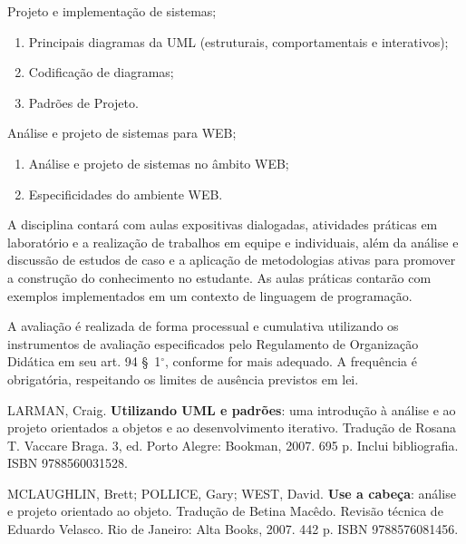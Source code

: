 \begin{pud}
\begin{description}[itemsep=0em]
		\item[UNIDADE III:] Projeto e implementação de sistemas; 
	         \begin{enumerate}[itemsep=0em, topsep=0em]
				\item Principais diagramas da UML (estruturais, comportamentais  e interativos);
				\item Codificação de diagramas;
				\item Padrões de Projeto.
            \end{enumerate}
            
        \item[UNIDADE IV:] Análise e projeto de sistemas para WEB;
	         \begin{enumerate}[itemsep=0em, topsep=0em]
				\item Análise e projeto de sistemas no âmbito WEB;
				\item Especificidades do ambiente WEB.
            \end{enumerate}

                                    

	\end{description}
	
	
	\metodologia
	A disciplina contará com aulas expositivas dialogadas, atividades práticas em laboratório e a realização de trabalhos em equipe e individuais, além da análise e discussão de estudos de caso e a aplicação de metodologias ativas para promover a construção do conhecimento no estudante. As aulas práticas contarão com exemplos implementados em um contexto de linguagem de programação.
	
	\avaliacao
	A avaliação é realizada de forma processual e cumulativa utilizando os instrumentos de avaliação especificados pelo Regulamento de Organização Didática em seu art. 94 \S~1$^\circ$, conforme for mais adequado. A frequência é obrigatória, respeitando os limites de ausência previstos em lei.
	
	
	
	\begin{bibbasica}
		 \item LARMAN, Craig. \textbf{Utilizando UML e padrões}: uma introdução à análise e ao projeto orientados a objetos e ao desenvolvimento iterativo. Tradução de Rosana T. Vaccare Braga. 3, ed. Porto Alegre: Bookman, 2007. 695 p. Inclui bibliografia. ISBN 9788560031528.
		\item MCLAUGHLIN, Brett; POLLICE, Gary; WEST, David. \textbf{Use a cabeça}: análise e projeto orientado ao objeto. Tradução de Betina Macêdo. Revisão técnica de Eduardo Velasco. Rio de Janeiro: Alta Books, 2007. 442 p. ISBN 9788576081456.
        

\end{bibbasica}
\end{pud}

